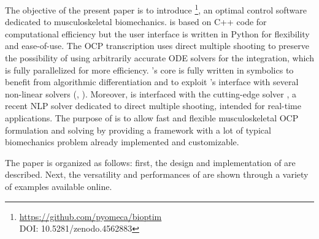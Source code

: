 The objective of the present paper is to introduce \bioptim\footnote{\url{https://github.com/pyomeca/bioptim}\\DOI: 10.5281/zenodo.4562883}, an  optimal control software dedicated to musculoskeletal biomechanics.
\bioptim is based on C++ code for computational efficiency but the user interface is written in Python for flexibility and ease-of-use. 
The OCP transcription uses direct multiple shooting to preserve the possibility of using arbitrarily accurate ODE solvers for the integration, which is fully parallelized for more efficiency.
\bioptim's core is fully written in \casadi symbolics to benefit from algorithmic differentiation and to exploit \casadi 's interface with several non-linear solvers (\ipopt, \snopt).
Moreover, \bioptim is interfaced with the cutting-edge solver \acados, a recent NLP solver dedicated to direct multiple shooting, intended for real-time applications.
The purpose of \bioptim is to allow fast and flexible musculoskeletal OCP formulation and solving by providing a framework with a lot of typical biomechanics problem already implemented and customizable.

The paper is organized as follows: first, the design and implementation of \bioptim are described.
Next, the versatility and performances of \bioptim are shown through a variety of examples available online. 
